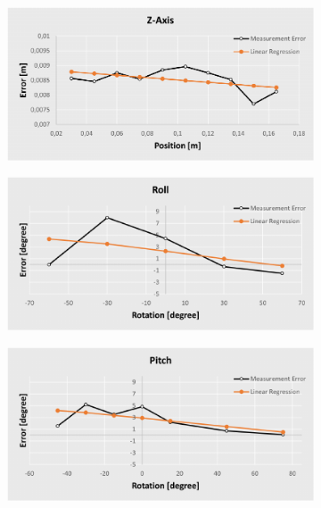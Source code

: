 \begin{figure}[h!]
{\begin{tcolorbox}
\begin{subfigure}[c]{.485\textwidth}
         \includegraphics[width=1\textwidth]{Cap5/Figuras/z_correction_asses.pdf}
     \end{subfigure}
     \begin{subfigure}[c]{.485\textwidth}
         \centering
         \includegraphics[width=1\textwidth]{Cap5/Figuras/roll_correction_asses.pdf}
     \end{subfigure}
     \hfill
     \begin{subfigure}[c]{.485\textwidth}
         \centering
         \includegraphics[width=1\textwidth]{Cap5/Figuras/pitch_correction_asses.pdf}

\end{subfigure}
\end{tcolorbox}}
\end{figure}
